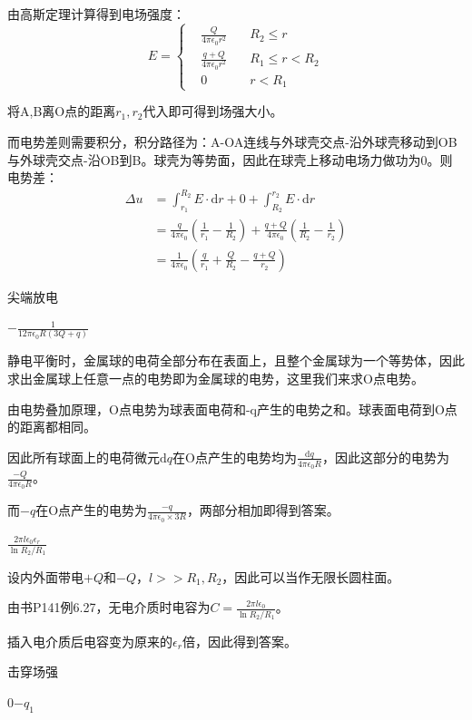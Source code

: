 \documentclass[b5paper,opensource,sourcefont,parskip]{qyxf-book}
\newcommand{\di}[1]{\mathrm{d}#1}
\begin{document}
\solve 由高斯定理计算得到电场强度：
\begin{equation}
E=\left\{
\begin{aligned}
&\frac{Q}{4\pi\epsilon_0 r^2}\quad &R_2\leqslant r\\
&\frac{q+Q}{4\pi\epsilon_0 r^2}\quad &R_1\leqslant r<R_2\\
&0	&r<R_1
\end{aligned}
\right.
\end{equation}

将A,B离O点的距离$ r_1,r_2 $代入即可得到场强大小。

而电势差则需要积分，积分路径为：A-OA连线与外球壳交点-沿外球壳移动到OB与外球壳交点-沿OB到B。球壳为等势面，因此在球壳上移动电场力做功为0。则电势差：
\begin{align*}
\Delta u&=\int_{r_1}^{R_2}E\cdot\di{r}+0+\int_{R_2}^{r_2}E\cdot\di{r}\\
&=\frac{q}{4\pi\epsilon_0}\left(\frac{1}{r_1}-\frac{1}{R_2}\right)+\frac{q+Q}{4\pi\epsilon_0}\left(\frac{1}{R_2}-\frac{1}{r_2}\right)\\
&=\frac{1}{4\pi\epsilon_0}\left(\frac{q}{r_1}+\frac{Q}{R_2}-\frac{q+Q}{r_2}\right)
\end{align*}

 尖端放电

 $ -\frac{1}{12\pi\epsilon_0 R(3Q+q)} $

\solve 静电平衡时，金属球的电荷全部分布在表面上，且整个金属球为一个等势体，因此求出金属球上任意一点的电势即为金属球的电势，这里我们来求O点电势。

由电势叠加原理，O点电势为球表面电荷和-q产生的电势之和。球表面电荷到O点的距离都相同。

因此所有球面上的电荷微元$\di{q}$在O点产生的电势均为$\frac{\di{q}}{4\pi\epsilon_0 R}$，因此这部分的电势为$\frac{-Q}{4\pi\epsilon_0 R}$。

而$ -q $在O点产生的电势为$\frac{-q}{4\pi\epsilon_0 \times 3R}$，两部分相加即得到答案。

 $\frac{2\pi l\epsilon_0\epsilon_r}{\ln R_2/R_1}$

\solve 设内外面带电$ +Q $和$ -Q $，$ l>>R_1,R_2 $，因此可以当作无限长圆柱面。

由书P141例6.27，无电介质时电容为$ C=\frac{2\pi l\epsilon_0}{\ln R_2/R_1} $。

插入电介质后电容变为原来的$ \epsilon_r $倍，因此得到答案。

 击穿场强

 $ 0 $\quad$ -q_1 $
\end{document}
